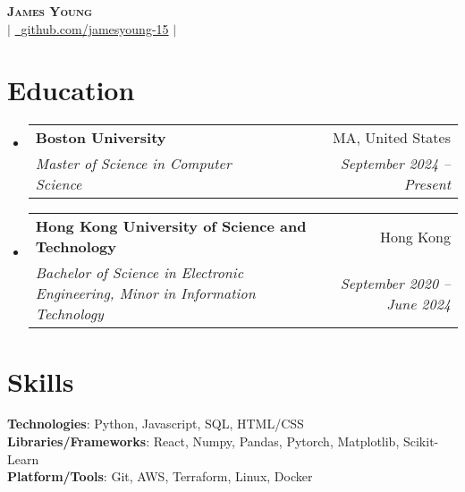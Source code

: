 \documentclass[letterpaper,11pt]{article}
\makeatletter
\newcommand{\resumeItem}[1]{
  \item\small{
    {#1 \vspace{-2pt}}
  }
}
\newcommand{\resumeSubheading}[4]{
  \vspace{-2pt}\item
    \begin{tabular*}{0.97\textwidth}[t]{l@{\extracolsep{\fill}}r}
      \textbf{#1} & #2 \\
      \textit{\small#3} & \textit{\small #4} \\
    \end{tabular*}\vspace{-7pt}
}
\newcommand{\resumeSubHeadingListStart}{\begin{itemize}[leftmargin=0.08in, label={}]}
\newcommand{\resumeSubHeadingListEnd}{\end{itemize}}
\newcommand{\resumeItemListStart}{\begin{itemize}[leftmargin=0.22in]}
\newcommand{\resumeItemListEnd}{\end{itemize}\vspace{-5pt}}
\makeatother
\begin{document}
\begin{center}
    \textbf{\Huge \scshape James Young} \\ \vspace{1pt}
    \small 
    \href{mailto:jamesyoung3931@gmail.com}{} $|$
    \href{https://github.com/jamesyoung-15} {\faGithub\ {github.com/jamesyoung-15}} $|$
    \href{https://jyyoung.com}{}
\end{center}


\section{Education}
  \resumeSubHeadingListStart
    \resumeSubheading
        {Boston University}{MA, United States}
        {Master of Science in Computer Science}{September 2024 -- Present}
        \vspace{5pt}
    \resumeSubheading
        {Hong Kong University of Science and Technology}{Hong Kong}
        {Bachelor of Science in Electronic Engineering, Minor in Information Technology}{September 2020 -- June 2024}
  \resumeSubHeadingListEnd

\section{Skills}
 \begin{itemize}[leftmargin=0.08in, label={}]
    \small{\item{
     \textbf{Technologies}{: Python, Javascript, SQL, HTML/CSS} \\
     \textbf{Libraries/Frameworks}{: React, Numpy, Pandas, Pytorch, Matplotlib, Scikit-Learn } \\
     \textbf{Platform/Tools}{: Git, AWS, Terraform, Linux, Docker} \\
    }}
 \end{itemize}
\end{document}

